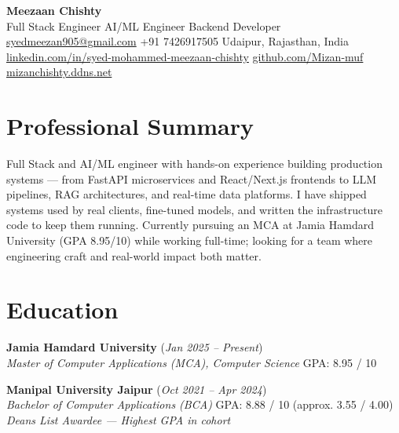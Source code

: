 \documentclass[10pt,letterpaper]{article}
\newcommand{\eduentry}[4]{%
  \textbf{#1} (\textit{#3})\\
  \textit{#2} \hfill GPA: #4
}
\begin{document}
\begin{center}
  {\LARGE\bfseries Meezaan Chishty}\\[0.1cm]
  {\normalsize Full Stack Engineer \textbullet{} AI/ML Engineer \textbullet{} Backend Developer}\\[0.12cm]
  {\small
    \href{mailto:syedmeezan905@gmail.com}{syedmeezan905@gmail.com}
    \quad\textbullet\quad
    +91 7426917505
    \quad\textbullet\quad
    Udaipur, Rajasthan, India
  }\\[0.04cm]
  {\small
    \href{https://www.linkedin.com/in/syed-mohammed-meezaan-chishty-19a4b0338}{linkedin.com/in/syed-mohammed-meezaan-chishty}
    \quad\textbullet\quad
    \href{https://github.com/Mizan-muf}{github.com/Mizan-muf}
    \quad\textbullet\quad
    \href{https://mizanchishty.ddns.net}{mizanchishty.ddns.net}
  }
\end{center}

\vspace{0.08cm}

\section{Professional Summary}

\noindent
Full Stack and AI/ML engineer with hands-on experience building production systems ---
from FastAPI microservices and React/Next.js frontends to LLM pipelines, RAG architectures,
and real-time data platforms. I have shipped systems used by real clients, fine-tuned models,
and written the infrastructure code to keep them running. Currently pursuing an MCA at
Jamia Hamdard University (GPA 8.95/10) while working full-time; looking for a team where
engineering craft and real-world impact both matter.

\vspace{0.05cm}

\section{Education}

\eduentry
  {Jamia Hamdard University}
  {Master of Computer Applications (MCA), Computer Science}
  {Jan 2025 -- Present}
  {8.95 / 10}

\vspace{0.2cm}

\eduentry
  {Manipal University Jaipur}
  {Bachelor of Computer Applications (BCA)}
  {Oct 2021 -- Apr 2024}
  {8.88 / 10 (approx. 3.55 / 4.00)}\\
  \small\textit{Dean\textquotesingle s List Awardee --- Highest GPA in cohort}
\end{document}
